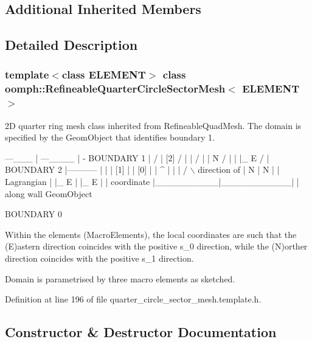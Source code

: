 \subsection*{Additional Inherited Members}


\subsection{Detailed Description}
\subsubsection*{template$<$class E\+L\+E\+M\+E\+NT$>$\newline
class oomph\+::\+Refineable\+Quarter\+Circle\+Sector\+Mesh$<$ E\+L\+E\+M\+E\+N\+T $>$}

2D quarter ring mesh class inherited from Refineable\+Quad\+Mesh. The domain is specified by the Geom\+Object that identifies boundary 1.


\begin{DoxyCode}
                     ---\_\_\_
                    |      ---\_\_\_\_
                    |              -   BOUNDARY 1
                    |               /  
                    |     [2]      /  |  
                    |             /     | 
                    | N          /        |  
                    | |\_ E      /          |    
     BOUNDARY 2     |-----------           |  
                    |          |    [1]    |
                    |   [0]    |           |  ^
                    |          |           | / \(\backslash\)  direction of
                    | N        |    N      |  |   Lagrangian 
                    | |\_ E     |    |\_ E   |  |   coordinate 
                    |\_\_\_\_\_\_\_\_\_\_|\_\_\_\_\_\_\_\_\_\_\_|  |   along wall GeomObject

                         BOUNDARY 0

Within the elements (MacroElements), the local coordinates
are such that the (E)astern direction coincides with the positive 
s\_0 direction,  \textcolor{keywordflow}{while} the (N)orther direction coincides with the positive 
s\_1 direction.
\end{DoxyCode}


Domain is parametrised by three macro elements as sketched. 

Definition at line 196 of file quarter\+\_\+circle\+\_\+sector\+\_\+mesh.\+template.\+h.



\subsection{Constructor \& Destructor Documentation}
\mbox{\label{classoomph_1_1RefineableQuarterCircleSectorMesh_a07b183ff3e548456e67b92b6fce41cde}} 
